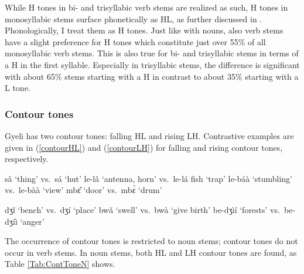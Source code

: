 While H tones in bi- and trisyllabic verb stems are realized as such, H tones in monosyllabic stems surface phonetically as HL, as further discussed in . Phonologically, I treat them as H tones. Just like with nouns, also verb stems have a slight preference for H tones which constitute just over 55\% of all monosyllabic verb stems. This is also true for bi- and trisyllabic stems in terms of a H in the first syllable. Especially in trisyllabic stems, the difference is significant with about 65\% stems starting with a H in contrast to about 35\% starting with a L tone. 


\subsubsection{Contour tones}
\label{sec:Contour}

Gyeli has two contour tones: falling HL and rising LH. Contrastive examples are given in (\ref{contourHL}) and (\ref{contourLH}) for falling and rising contour tones, respectively.


\begin{exe}
\ex\label{contourHL}
\begin{xlist}
\ex sâ `thing' vs.\ sá `hut'
\ex  le-lâ `antenna, horn' vs.\ le-lá fish `trap' 
\ex le-báà `stumbling' vs.\ le-bàà `view'
\ex  mbɛ̂ `door' vs.\ mbɛ̀ `drum'
\end{xlist}
\end{exe}

\begin{exe}
\ex\label{contourLH}
\begin{xlist}
\ex  dʒǐ `bench' vs.\ dʒí `place' 
\ex bwǎ `swell' vs.\ bwà `give birth'
\ex be-dʒìí `forests' vs.\ be-dʒíì `anger'
\end{xlist}
\end{exe}


The occurrence of contour tones is restricted to noun stems; contour tones do not occur in verb stems. In noun stems, both HL and LH contour tones are found, as Table \ref{Tab:ContToneN} shows.



